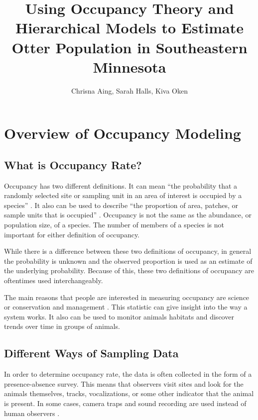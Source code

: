 \documentclass[12pt]{article}
\begin{document}
\title{Using Occupancy Theory and Hierarchical Models to Estimate Otter
Population in Southeastern Minnesota}
\date{}
\author{Chrisna Aing, Sarah Halls, Kiva Oken}
\maketitle

\section{Overview of Occupancy Modeling}

    \subsection{What is Occupancy Rate?}
    Occupancy has two different definitions. It can mean ``the probability that
    a randomly selected site or sampling unit in an area of interest is occupied
    by a species'' \cite{MacKenzie2006}. It also can be used to describe ``the
    proportion of area, patches, or sample units that is occupied''
    \cite{MacKenzie2006}. Occupancy is not the same as the abundance, or
    population size, of a species. The number of members of a species is not
    important for either definition of occupancy.

    While there is a difference between these two definitions of occupancy, in
    general the probability is unknown and the observed proportion is used as an
    estimate of the underlying probability. Because of this, these two
    definitions of occupancy are oftentimes used interchangeably.

    The main reasons that people are interested in measuring occupancy are
    science or conservation and management \cite{MacKenzie2006}. This statistic
    can give insight into the way a system works. It also can be used to monitor
    animals habitats and discover trends over time in groups of animals.

    \subsection{Different Ways of Sampling Data}
    In order to determine occupancy rate, the data is often collected in the
    form of a presence-absence survey. This means that observers visit sites and
    look for the animals themselves, tracks, vocalizations, or some other
    indicator that the animal is present. In some cases, camera traps and sound
    recording are used instead of human observers \cite{MacKenzie2006}.
\end{document}
